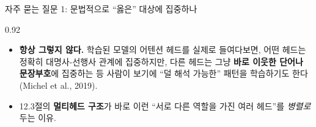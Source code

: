 \begin{frame}{자주 묻는 질문 1: 문법적으로 ``옳은'' 대상에 집중하나}
\begin{center}\begin{varwidth}{0.92\textwidth}
  \begin{itemize}
    \item \textbf{항상 그렇지 않다.} 학습된 모델의 어텐션 헤드를
      실제로 들여다보면, 어떤 헤드는 정확히 대명사-선행사 관계에
      집중하지만, 다른 헤드는 그냥 \textbf{바로 이웃한 단어나
      문장부호}에 집중하는 등 사람이 보기에 ``덜 해석 가능한''
      패턴을 학습하기도 한다 (Michel et al., 2019).
    \item 12.3절의 \textbf{멀티헤드 구조}가 바로 이런
      ``서로 다른 역할을 가진 여러 헤드''를 \emph{병렬로} 두는
      이유.
  \end{itemize}
\end{varwidth}\end{center}
\end{frame}
